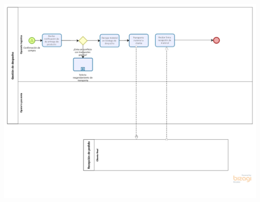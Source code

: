 \documentclass[11pt]{article}
\begin{document}
\begin{center}
\includegraphics[width=.9\linewidth]{./assets/build/to_be/gestion_despacho.png}
\end{center}
\end{document}
